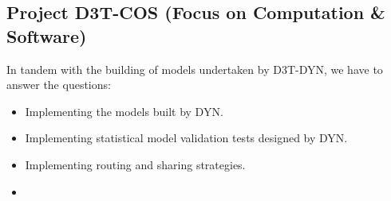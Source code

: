 \subsection*{Project D3T-COS (Focus on Computation & Software)}
In tandem with the building of models undertaken by D3T-DYN, we have to answer the questions:
\begin{itemize}
\item Implementing the models built by DYN. 
\item Implementing statistical model validation tests designed by DYN.
\item Implementing routing \cite{guan_efficient_2013, zhang_probability_2013} and sharing \cite{santi_quantifying_2014} strategies. 
\item 
\end{itemize}